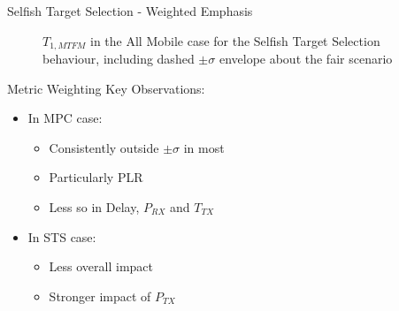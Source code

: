\documentclass{beamer}
\begin{document}
\begin{frame}{Selfish Target Selection - Weighted Emphasis}
\begin{figure}[h]
\caption{$T_{1,MTFM}$ in the All Mobile case for the Selfish Target Selection behaviour, including dashed $\pm\sigma$ envelope about the fair scenario\hyperlink{fig:selfish_emph_closeup}{}}
 
\end{figure}
\end{frame}

\begin{frame}{Metric Weighting}
  Key Observations:
  \begin{itemize}
    \item In MPC case:
      \begin{itemize}
        \item Consistently outside $\pm\sigma$ in most
        \item Particularly PLR
        \item Less so in Delay, $P_{RX}$ and $T_{TX}$
      \end{itemize}
    \item In STS case:
      \begin{itemize}
        \item Less overall impact
        \item Stronger impact of $P_{TX}$
      \end{itemize}
  \end{itemize}

\end{frame}
\end{document}
